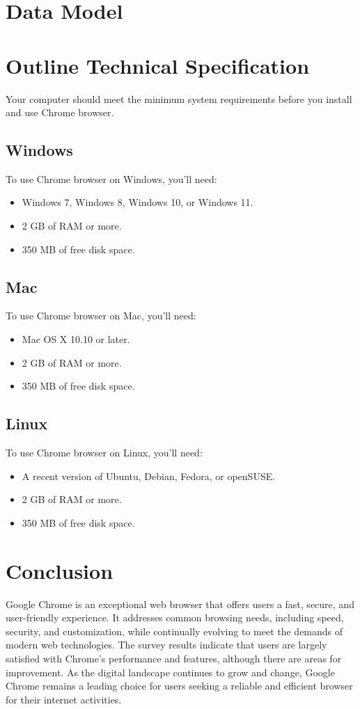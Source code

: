\documentclass[a4paper,12pt]{article}
\begin{document}
\section{Data Model}

\section{Outline Technical Specification}
Your computer should meet the minimum system requirements before you install and use Chrome browser.

\subsection{Windows}
To use Chrome browser on Windows, you'll need:
\begin{itemize}
    \item Windows 7, Windows 8, Windows 10, or Windows 11.
    \item 2 GB of RAM or more.
    \item 350 MB of free disk space.
\end{itemize}

\subsection{Mac}
To use Chrome browser on Mac, you'll need:
\begin{itemize}
    \item Mac OS X 10.10 or later.
    \item 2 GB of RAM or more.
    \item 350 MB of free disk space.
\end{itemize}

\subsection{Linux}
To use Chrome browser on Linux, you'll need:
\begin{itemize}
    \item A recent version of Ubuntu, Debian, Fedora, or openSUSE.
    \item 2 GB of RAM or more.
    \item 350 MB of free disk space.
\end{itemize}

\section{Conclusion}
Google Chrome is an exceptional web browser that offers users a fast, secure, and user-friendly experience. It addresses common browsing needs, including speed, security, and customization, while continually evolving to meet the demands of modern web technologies. The survey results indicate that users are largely satisfied with Chrome's performance and features, although there are areas for improvement. As the digital landscape continues to grow and change, Google Chrome remains a leading choice for users seeking a reliable and efficient browser for their internet activities.
\end{document}
